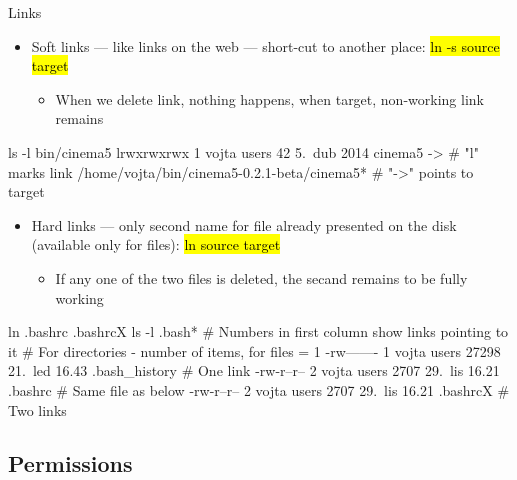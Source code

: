\documentclass[compress, ucs, xelatex, 11pt, xcolor=svgnames,
  hyperref={
    bookmarks=true,
    unicode=true,
    colorlinks=true,
    pdftitle={Linux, command line and MetaCentrum},
    plainpages=false,
    pdfauthor={Vojtech Zeisek},
    pdfsubject={Course about use of Linux command line, writing shell scripts and using MetaCentrum of CESNET},
    pdfcreator={XeLaTeX},
    pdfkeywords={Linux, GNU, BASH, shell, command line, MetaCentrum},
    linkcolor=DarkRed,
    anchorcolor=DarkBlue,
    citecolor=Indigo,
    filecolor=NavyBlue,
    menucolor=DarkMagenta,
    urlcolor=DarkBlue,
    pdftex},
  url={hyphens, lowtilde} %
  ]{beamer}
\renewcommand{\texttt}[1]{\hl{\ttfamily #1}}
\begin{document}
\begin{frame}[fragile]{Links}
  \label{links}
  \begin{itemize}
    \item Soft links --- like links on the web --- short-cut to another place: \texttt{ln -s source target}
    \begin{itemize}
      \item When we delete link, nothing happens, when target, non-working link remains
    \end{itemize}
  \end{itemize}
  \begin{bashcode}
    ls -l bin/cinema5
    lrwxrwxrwx 1 vojta users 42 5. dub 2014 cinema5 -> # "l" marks link
      /home/vojta/bin/cinema5-0.2.1-beta/cinema5* # "->" points to target
  \end{bashcode}
  \begin{itemize}
    \item Hard links --- only second name for file already presented on the disk (available only for files): \texttt{ln source target}
    \begin{itemize}
      \item If any one of the two files is deleted, the secand remains to be fully working
    \end{itemize}
  \end{itemize}
  \begin{bashcode}
    ln .bashrc .bashrcX
    ls -l .bash* # Numbers in first column show links pointing to it
                 # For directories - number of items, for files = 1
    -rw------- 1 vojta users 27298 21. led 16.43 .bash_history # One link
    -rw-r--r-- 2 vojta users  2707 29. lis 16.21 .bashrc # Same file as below
    -rw-r--r-- 2 vojta users  2707 29. lis 16.21 .bashrcX # Two links
  \end{bashcode}
\end{frame}

\subsection{Permissions}
\end{document}
